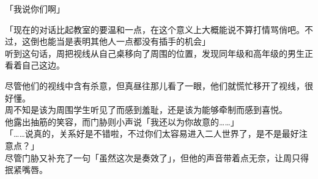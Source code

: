 「我说你们啊」

「现在的对话比起教室的要温和一点，在这个意义上大概能说不算打情骂俏吧。不过，这倒也能当是表明其他人一点都没有插手的机会」\\

听到这句话，周把视线从自己桌移向了周围的位置，发现同年级和高年级的男生正看着自己这边。

尽管他们的视线中含有杀意，但真昼往那儿看了一眼，他们就慌忙移开了视线，很好懂。\\

周不知是该为周围学生听见了而感到羞耻，还是该为能够牵制而感到喜悦。\\

他露出抽筋的笑容，而门胁则小声说「我还以为你故意的……」\\

「……说真的，关系好是不错啦，不过你们太容易进入二人世界了，是不是最好注意点？」\\

尽管门胁又补充了一句「虽然这次是奏效了」，但他的声音带着点无奈，让周只得抿紧嘴唇。
